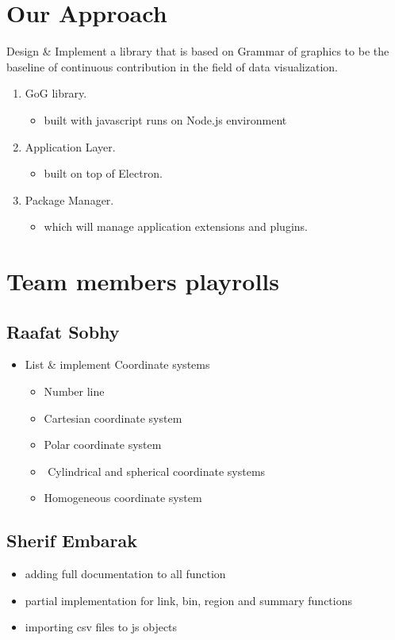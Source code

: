 \documentclass[12pt]{article}
\begin{document}
\section{Our Approach}
Design \& Implement a library that is based on Grammar of graphics to be the baseline of continuous contribution in the field of data visualization. \\
\begin{enumerate}
\item GoG library.
\begin{itemize}
\item built with javascript runs on Node.js environment
\end{itemize}
\item Application Layer.
\begin{itemize}
\item built on top of Electron.
\end{itemize}
\item Package Manager.
\begin{itemize}
\item which will manage application extensions and plugins.
\end{itemize}
\end{enumerate}

\section{Team members playrolls}
\subsection{Raafat Sobhy}
\begin{itemize}
\item List \& implement Coordinate systems
\begin{itemize}
\item Number line
­\item Cartesian coordinate system
\item Polar coordinate system
\item ­ Cylindrical and spherical coordinate systems
\item Homogeneous coordinate system
\end{itemize}
\end{itemize}
\subsection{Sherif Embarak}
\begin{itemize}
\item adding full documentation to all function
\item partial implementation for link, bin, region and summary functions
\item importing csv files to js objects
\end{itemize}
\end{document}
